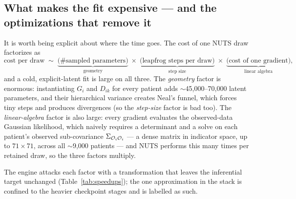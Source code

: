 \subsection{What makes the fit expensive --- and the optimizations that remove it}
\label{sub:cost}
It is worth being explicit about where the time goes. The cost of one NUTS draw factorizes as
\[
\text{cost per draw}\;\sim\;\underbrace{\big(\text{\# sampled parameters}\big)}_{\text{geometry}}\;\times\;
\underbrace{\big(\text{leapfrog steps per draw}\big)}_{\text{step size}}\;\times\;
\underbrace{\big(\text{cost of one gradient}\big)}_{\text{linear algebra}},
\]
and a cold, explicit-latent fit is large on all three. The \emph{geometry} factor is enormous: instantiating
$G_i$ and $D_{ik}$ for every patient adds $\sim$45{,}000--70{,}000 latent parameters, and their hierarchical
variance creates Neal's funnel, which forces tiny steps and produces divergences (so the \emph{step-size}
factor is bad too). The \emph{linear-algebra} factor is also large: every gradient evaluates the observed-data
Gaussian likelihood, which naively requires a determinant and a solve on each patient's observed sub-covariance
$\Sigma_{\mathcal{O}_i\mathcal{O}_i}$ --- a dense matrix in indicator space, up to $71\times 71$, across all $\sim$9{,}000
patients --- and NUTS performs this many times per retained draw, so the three factors multiply.

The engine attacks each factor with a transformation that leaves the inferential target unchanged
(Table~\ref{tab:speedups}); the one approximation in the stack is confined to the heavier checkpoint stages and
is labelled as such.

